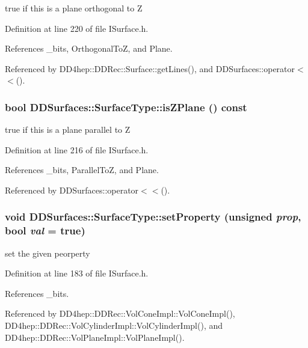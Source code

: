 true if this is a plane orthogonal to Z 

Definition at line 220 of file ISurface.h.

References \_\-bits, OrthogonalToZ, and Plane.

Referenced by DD4hep::DDRec::Surface::getLines(), and DDSurfaces::operator$<$$<$().\hypertarget{class_d_d_surfaces_1_1_surface_type_ab440e93ce5a0bd8412d6cacd4e575321}{
\subsubsection[{isZPlane}]{\setlength{\rightskip}{0pt plus 5cm}bool DDSurfaces::SurfaceType::isZPlane () const}}
\label{class_d_d_surfaces_1_1_surface_type_ab440e93ce5a0bd8412d6cacd4e575321}


true if this is a plane parallel to Z 

Definition at line 216 of file ISurface.h.

References \_\-bits, ParallelToZ, and Plane.

Referenced by DDSurfaces::operator$<$$<$().\hypertarget{class_d_d_surfaces_1_1_surface_type_aac5ebe16c0c230033f68c4e3f5a349af}{
\subsubsection[{setProperty}]{\setlength{\rightskip}{0pt plus 5cm}void DDSurfaces::SurfaceType::setProperty (unsigned {\em prop}, \/  bool {\em val} = {\ttfamily true})}}
\label{class_d_d_surfaces_1_1_surface_type_aac5ebe16c0c230033f68c4e3f5a349af}


set the given peorperty 

Definition at line 183 of file ISurface.h.

References \_\-bits.

Referenced by DD4hep::DDRec::VolConeImpl::VolConeImpl(), DD4hep::DDRec::VolCylinderImpl::VolCylinderImpl(), and DD4hep::DDRec::VolPlaneImpl::VolPlaneImpl().


